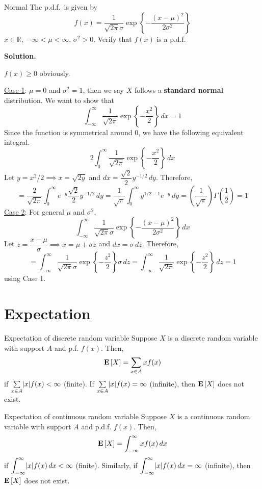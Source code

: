 \begin{Example}{Normal}{}
    The p.d.f.\ is given by
    \[ f(x)=\frac{1}{\sqrt{2\pi}\sigma}\exp\left\{ -\frac{(x-\mu)^2}{2\sigma^2} \right\}  \]
    $ x\in\mathbb{R} $, $ -\infty<\mu<\infty $, $ \sigma^2>0 $.
    Verify that $ f(x) $ is a p.d.f.

    \textbf{Solution.}

    $ f(x)\geqslant 0 $ obviously.

    \underline{Case 1}: $ \mu=0 $ and $ \sigma^2=1 $, then
    we say $ X $ follows a \textbf{standard normal} distribution.
    We want to show that
    \[ \int_{-\infty}^{\infty} \frac{1}{\sqrt{2\pi}}\exp\left\{ -\frac{x^2}{2} \right\} \, d{x}=1  \]
    Since the function is symmetrical around 0, we have the following equivalent integral.
    \[ 2\int_{0}^{\infty} \frac{1}{\sqrt{2\pi}}\exp\left\{ -\frac{x^2}{2} \right\} \, d{x}  \]
    Let $ y=x^2/2\implies x=\sqrt{2y} $
    and $ dx=\dfrac{\sqrt{2}}{2} y^{-1/2}\,dy $. Therefore,
    \[ =\frac{2}{\sqrt{2\pi}}\int_{0}^{\infty} e^{-y}\frac{\sqrt{2}}{2} y^{-1/2}\, d{y}
        =\frac{1}{\sqrt{\pi}}\int_{0}^{\infty} y^{1/2-1}e^{-y}\, d{y}=
        \left( \frac{1}{\sqrt{\pi}}  \right)\Gamma\left( \frac{1}{2} \right)=1    \]
    \underline{Case 2}: For general $ \mu $ and $ \sigma^2 $,
    \[ \int_{-\infty}^{\infty}  \frac{1}{\sqrt{2\pi}\sigma}\exp\left\{ -\frac{(x-\mu)^2}{2\sigma^2} \right\} \, d{x} \]
    Let $ z=\dfrac{x-\mu}{\sigma}\implies x=\mu+\sigma z  $
    and $ dx=\sigma\,dz $. Therefore,
    \[ =\int_{-\infty}^{\infty} \frac{1}{\sqrt{2\pi}\sigma}
        \exp\left\{ -\frac{z^2}{2}\right\}\sigma \, d{z}=
        \int_{-\infty}^{\infty} \frac{1}{\sqrt{2\pi}}\exp\left\{ -\frac{z^2}{2} \right\} \, d{z}=1   \]
    using Case 1.
\end{Example}
\setcounter{section}{6}
\section{Expectation}
\begin{Definition}{Expectation of discrete random variable}{}
    Suppose $ X $ is a discrete random variable with support
    $ A $ and p.f. $ f(x) $. Then,
    \[ \bm{\mathrm{E}}\left[X\right]=\sum\limits_{x\in A}x f(x)  \]
    if $ \sum\limits_{x\in A}\lvert x\rvert f(x) < \infty $ (finite).
    If $ \sum\limits_{x\in A}\lvert x\rvert f(x) =\infty $ (infinite), then
    $ \bm{\mathrm{E}}\left[X\right] $ does not exist.
\end{Definition}

\begin{Definition}{Expectation of continuous random variable}{}
    Suppose $ X $ is a continuous random variable with support $ A $
    and p.d.f. $ f(x) $. Then,
    \[ \bm{\mathrm{E}}\left[X\right]=\int_{-\infty}^{\infty} x f(x)\, d{x}  \]
    if $ \displaystyle \int_{-\infty}^{\infty} \lvert x\rvert f(x)\, d{x} <\infty $
    (finite). Similarly,
    if $ \displaystyle \int_{-\infty}^{\infty} \lvert x\rvert f(x)\, d{x} =\infty $
    (infinite),
    then $ \bm{\mathrm{E}}\left[X\right] $ does not exist.
\end{Definition}

